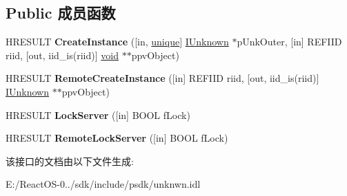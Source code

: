\subsection*{Public 成员函数}
\begin{DoxyCompactItemize}
\item 
\mbox{\label{interface_i_class_factory_ad96e467df94779edf9c7add5f8e34b07}} 
H\+R\+E\+S\+U\+LT {\bfseries Create\+Instance} (\mbox{[}in, \hyperlink{interfaceunique}{unique}\mbox{]} \hyperlink{interface_i_unknown}{I\+Unknown} $\ast$p\+Unk\+Outer, \mbox{[}in\mbox{]} R\+E\+F\+I\+ID riid, \mbox{[}out, iid\+\_\+is(riid)\mbox{]} \hyperlink{interfacevoid}{void} $\ast$$\ast$ppv\+Object)
\item 
\mbox{\label{interface_i_class_factory_a94e1854344bfdff18ba117ca09469639}} 
H\+R\+E\+S\+U\+LT {\bfseries Remote\+Create\+Instance} (\mbox{[}in\mbox{]} R\+E\+F\+I\+ID riid, \mbox{[}out, iid\+\_\+is(riid)\mbox{]} \hyperlink{interface_i_unknown}{I\+Unknown} $\ast$$\ast$ppv\+Object)
\item 
\mbox{\label{interface_i_class_factory_ae00f6200063aa66086d085026ece5221}} 
H\+R\+E\+S\+U\+LT {\bfseries Lock\+Server} (\mbox{[}in\mbox{]} B\+O\+OL f\+Lock)
\item 
\mbox{\label{interface_i_class_factory_a72b7602cea08681a5e21ccb07e74eb11}} 
H\+R\+E\+S\+U\+LT {\bfseries Remote\+Lock\+Server} (\mbox{[}in\mbox{]} B\+O\+OL f\+Lock)
\end{DoxyCompactItemize}


该接口的文档由以下文件生成\+:\begin{DoxyCompactItemize}
\item 
E\+:/\+React\+O\+S-\/0../sdk/include/psdk/unknwn.\+idl\end{DoxyCompactItemize}
